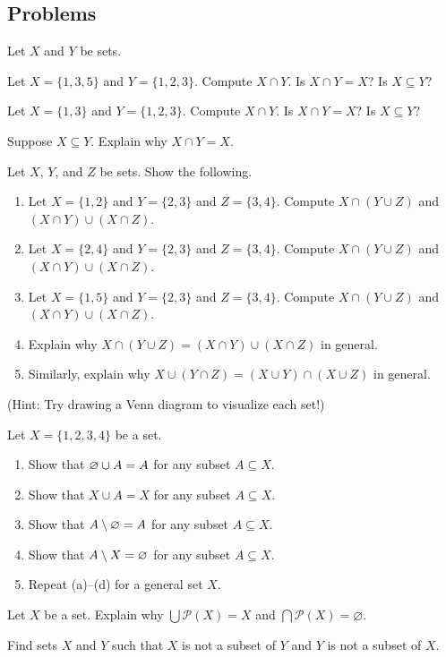 \documentclass[../notes.tex]{subfiles}
\begin{document}
\subsection{Problems}
\begin{homework}
    Let $X$ and $Y$ be sets.
    \begin{listalph}
        \item Let $X=\{1,3,5\}$ and $Y=\{1,2,3\}$. Compute $X\cap Y$. Is $X\cap Y=X$? Is $X\subseteq Y$?
        \item Let $X=\{1,3\}$ and $Y=\{1,2,3\}$. Compute $X\cap Y$. Is $X\cap Y=X$? Is $X\subseteq Y$?
        \item Suppose $X\subseteq Y$. Explain why $X\cap Y=X$.
    \end{listalph}
\end{homework}
\begin{homework}
    Let $X$, $Y$, and $Z$ be sets. Show the following.
    \begin{enumerate}[label=(\alph*)]
        \item Let $X=\{1,2\}$ and $Y=\{2,3\}$ and $Z=\{3,4\}$. Compute $X\cap (Y\cup Z)$ and $(X\cap Y)\cup(X\cap Z)$.
        \item Let $X=\{2,4\}$ and $Y=\{2,3\}$ and $Z=\{3,4\}$. Compute $X\cap (Y\cup Z)$ and $(X\cap Y)\cup(X\cap Z)$.
        \item Let $X=\{1,5\}$ and $Y=\{2,3\}$ and $Z=\{3,4\}$. Compute $X\cap (Y\cup Z)$ and $(X\cap Y)\cup(X\cap Z)$.
        \item Explain why $X \cap (Y \cup Z) = (X \cap Y) \cup (X \cap Z)$ in general.
        \item Similarly, explain why $X \cup (Y \cap Z) = (X \cup Y) \cap (X \cup Z)$ in general.
    \end{enumerate}
    (Hint: Try drawing a Venn diagram to visualize each set!)
\end{homework}
\begin{homework}
    Let $X=\{1,2,3,4\}$ be a set.
    \begin{enumerate}[label=(\alph*)]
        \item Show that $\varnothing\cup A=A$ for any subset $A\subseteq X$.
        \item Show that $X\cup A=X$ for any subset $A\subseteq X$.
        \item Show that $A\setminus\varnothing=A$ for any subset $A\subseteq X$.
        \item Show that $A\setminus X=\varnothing$ for any subset $A\subseteq X$.
        \item Repeat (a)--(d) for a general set $X$.
    \end{enumerate}
\end{homework}
\begin{homework}
    Let $X$ be a set. Explain why $\bigcup \mathcal P(X) = X$ and $\bigcap \mathcal P(X) = \varnothing$.
\end{homework}
\begin{homework}
    Find sets $X$ and $Y$ such that $X$ is not a subset of $Y$ and $Y$ is not a subset of $X$.
\end{homework}
\end{document}
